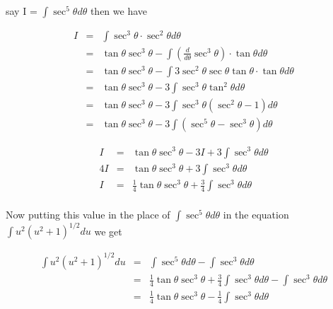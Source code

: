 \documentclass{report}
\begin{document}
\paragraph{ }
say I = $\int \sec^5 \theta d\theta$ then we have 
\begin{center}
\begin{eqnarray}
I	&=& \int \sec^3 \theta \cdot \sec^2 \theta d\theta \nonumber \\
    &=& \tan \theta \sec ^3 \theta - \int \left(\frac{d}{d\theta} \sec ^3 \theta \right) \cdot \tan \theta d\theta \nonumber \\
    &=& \tan \theta \sec ^3 \theta - \int 3\sec^2 \theta \sec \theta \tan \theta \cdot \tan \theta d\theta \nonumber \\
    &=& \tan \theta \sec ^3 \theta - 3\int \sec^3 \theta \tan^2 \theta d\theta \nonumber \\
    &=& \tan \theta \sec ^3 \theta - 3\int \sec^3 \theta (\sec^2 \theta -1) d\theta \nonumber \\
    &=& \tan \theta \sec ^3 \theta - 3\int (\sec^5 \theta - \sec ^3\theta ) d\theta \nonumber
\end{eqnarray}
\end{center}
\begin{center}
\begin{eqnarray}
	I &=& \tan \theta \sec ^3 \theta -  3I + 3\int \sec^3 \theta d\theta \nonumber \\
	4I &=& \tan \theta \sec ^3 \theta + 3\int \sec^3 \theta d\theta \nonumber \\
	I &=& \frac{1}{4}\tan \theta \sec ^3 \theta + \frac{3}{4}\int \sec^3 \theta d\theta \nonumber
\end{eqnarray}
\end{center}
\paragraph{ }
Now putting this value in the place of $\int \sec^5 \theta d\theta $ in the equation	$\int u^2(u^2+1)^{1/2}du$ we get 
\begin{center}
\begin{eqnarray}
\int u^2(u^2+1)^{1/2}du &=& \int \sec^5 \theta d\theta - \int \sec^3 \theta d\theta  \nonumber \\
	&=& \frac{1}{4}\tan \theta \sec ^3 \theta + \frac{3}{4}\int \sec^3 \theta d\theta - \int \sec^3 \theta d\theta  \nonumber \\
	&=& \frac{1}{4}\tan \theta \sec ^3 \theta - \frac{1}{4} \int \sec^3 \theta d\theta  \nonumber
\end{eqnarray}
\end{center}
\end{document}
